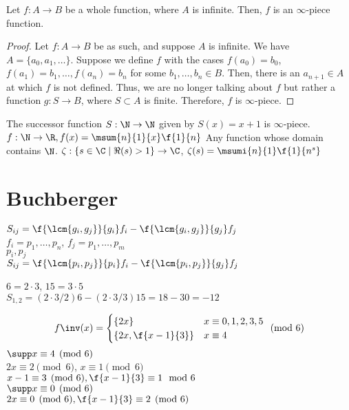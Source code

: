 \documentclass[12pt]{article}
\begin{document}
    \begin{theorem}
        Let $f:A \to B$ be a whole function, where $A$ is infinite. Then, $f$ is an $\infty$-piece function. 
    \end{theorem}
    \begin{proof}
        Let $f:A \to B$ be as such, and suppose $A$ is infinite. We have $A = \{a_0, a_1,\dots\}$. Suppose we define $f$ with the cases $f(a_0) = b_0$, $f(a_1) = b_1, \dots, f(a_n) = b_n$ for some $b_1,\dots,b_n \in B$. Then, there is an $a_{n + 1} \in A$ at which $f$ is not defined. Thus, we are no longer talking about $f$ but rather a function $g:S \to B$, where $S \subset A$ is finite. Therefore, $f$ is $\infty$-piece. 
    \end{proof}
    \begin{examples*}
        The successor function $S:\N \to \N$ given by $S(x) = x + 1$ is $\infty$-piece. \p
        $f:\N \to \R, f(x) = \msum{n}{1}{x} \f{1}{n}$ \p
        Any function whose domain contains $\N$. \p
        $\zeta:\{s \in \C \mid \Re(s) > 1\} \to \C$, $\zeta(s) = \msumi{n}{1} \f{1}{n^s}$
    \end{examples*}
    \section{Buchberger}
    $S_{ij} = \f{\lcm{g_i, g_j}}{g_i}f_i - \f{\lcm{g_i, g_j}}{g_j}f_j$ \\

    $f_i = p_1,\dots,p_n$, $f_j = p_1,\dots,p_m$ \\
    $p_i,p_j$ \\
    $S_{ij} = \f{\lcm{p_i, p_j}}{p_i}f_i - \f{\lcm{p_i, p_j}}{g_j}f_j$

    $6 = 2 \cdot 3$, $15 = 3 \cdot 5$ \\
    $S_{1,2} 
    = (2 \cdot 3 / 2)6 - (2 \cdot 3 / 3)15
    = 18 - 30 = -12$

    \[
        f\inv(x) = 
        \begin{cases}
            \{2x\} & x \equiv 0, 1, 2, 3, 5 \\
            \{2x, \f{x - 1}{3}\} & x \equiv 4
        \end{cases}
        \pmod 6
    \]
    $\supp x \equiv 4 \pmod 6$ \\
    $2x \equiv 2 \pmod 6$, $x \equiv 1 \pmod 6$ \\
    $x - 1 \equiv 3 \pmod 6, \f{x - 1}{3} \equiv 1 \mod 6$ \\

    $\supp x \equiv 0 \pmod 6$ \\
    $2x \equiv 0 \pmod 6, \f{x - 1}{3} \equiv 2 \pmod 6$ \\
\end{document}

